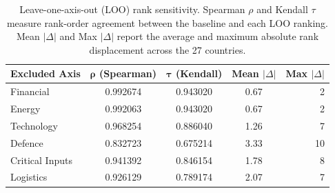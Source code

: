 \begin{table}[htbp]
\centering
\caption{Leave-one-axis-out (LOO) rank sensitivity.  Spearman $\rho$ and Kendall
$\tau$ measure rank-order agreement between the baseline and each LOO ranking.
Mean $|\Delta|$ and Max $|\Delta|$ report the average and maximum absolute rank
displacement across the 27 countries.}
\label{tab:loo-summary}
\begin{tabular}{@{}l S[table-format=1.6] S[table-format=1.6] S[table-format=1.2] r@{}}
\toprule
{\textbf{Excluded Axis}} & {$\boldsymbol{\rho}$ \textbf{(Spearman)}} & {$\boldsymbol{\tau}$ \textbf{(Kendall)}} & {\textbf{Mean} $|\Delta|$} & {\textbf{Max} $|\Delta|$} \\
\midrule
  Financial & 0.992674 & 0.943020 & 0.67 & 2 \\
  Energy & 0.992063 & 0.943020 & 0.67 & 2 \\
  Technology & 0.968254 & 0.886040 & 1.26 & 7 \\
  Defence & 0.832723 & 0.675214 & 3.33 & 10 \\
  Critical Inputs & 0.941392 & 0.846154 & 1.78 & 8 \\
  Logistics & 0.926129 & 0.789174 & 2.07 & 7 \\
\bottomrule
\end{tabular}
\end{table}